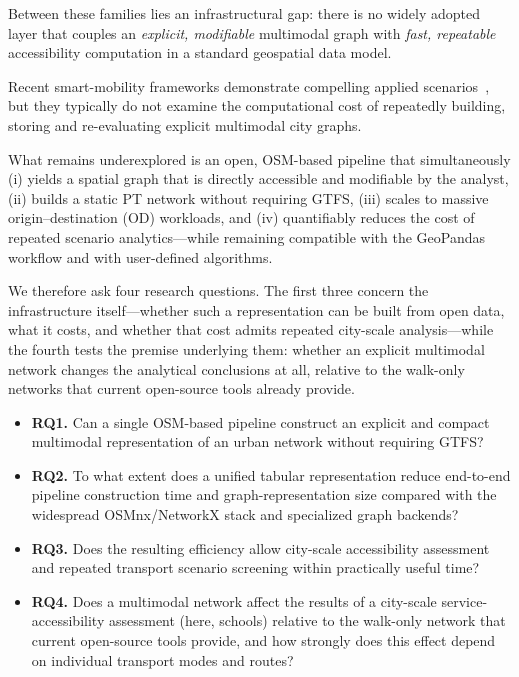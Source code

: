 \documentclass[smartcities,article,submit,moreauthors]{Definitions/mdpi}
\begin{document}
    Between these families lies an infrastructural gap: there is no widely adopted layer that couples an
    \emph{explicit, modifiable} multimodal graph with \emph{fast, repeatable} accessibility computation
    in a standard geospatial data model.

    Recent smart-mobility frameworks demonstrate compelling applied
    scenarios~\cite{gogousou2026mobilityoracle,shulajkovska2024framework,salanovagrau2026pollution}, but
    they typically do not examine the computational cost of repeatedly building, storing and
    re-evaluating explicit multimodal city graphs.

    What remains underexplored is an open, OSM-based pipeline that simultaneously (i) yields a spatial
    graph that is directly accessible and modifiable by the analyst, (ii) builds a static PT network
    without requiring GTFS, (iii) scales to massive origin--destination (OD) workloads, and (iv)
    quantifiably reduces the cost of repeated scenario analytics---while remaining compatible with the
    GeoPandas workflow and with user-defined algorithms.

    We therefore ask four research questions.
    The first three concern the infrastructure itself---whether such a representation can be built from
    open data, what it costs, and whether that cost admits repeated city-scale analysis---while the
    fourth tests the premise underlying them: whether an explicit multimodal network changes the
    analytical conclusions at all, relative to the walk-only networks that current open-source tools
    already provide.
    \begin{itemize}
        \item \textbf{RQ1.} Can a single OSM-based pipeline construct an explicit and compact
        multimodal representation of an urban network without requiring GTFS?
        \item \textbf{RQ2.} To what extent does a unified tabular representation reduce end-to-end pipeline construction
        time and graph-representation size compared with the widespread OSMnx/NetworkX stack and specialized graph backends?
        \item \textbf{RQ3.} Does the resulting efficiency allow city-scale accessibility assessment and
        repeated transport scenario screening within practically useful time?
        \item \textbf{RQ4.} Does a multimodal network affect the results of a city-scale
        service-accessibility assessment (here, schools) relative to the walk-only network that current
        open-source tools provide, and how strongly does this effect depend on individual transport
        modes and routes?

    \end{itemize}
\end{document}

